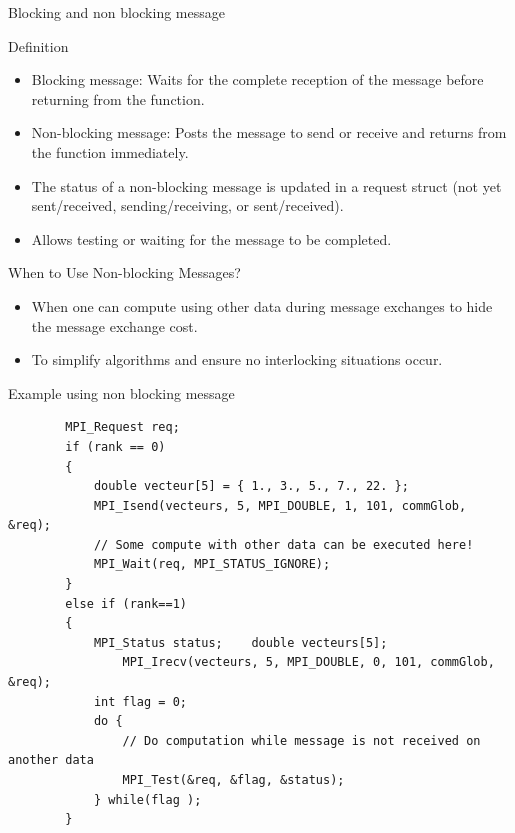 \documentclass[compress,10pt,aspectratio=169]{beamer}
\begin{document}
\begin{frame}[fragile]{Blocking and non blocking message}
    \scriptsize
    \begin{block}{Definition}
        \begin{itemize}
            \item Blocking message: Waits for the complete reception of the message before returning from the function.
            \item Non-blocking message: Posts the message to send or receive and returns from the function immediately.
            \item The status of a non-blocking message is updated in a request struct (not yet sent/received, sending/receiving, or sent/received).
            \item Allows testing or waiting for the message to be completed.
        \end{itemize}
    \end{block}
    
    \begin{exampleblock}{When to Use Non-blocking Messages?}
        \begin{itemize}
            \item When one can compute using other data during message exchanges to hide the message exchange cost.
            \item To simplify algorithms and ensure no interlocking situations occur.
        \end{itemize}
    \end{exampleblock}

\end{frame}

\begin{frame}[fragile]{Example using non blocking message}
    
    \begin{verbatim}
        MPI_Request req;
        if (rank == 0) 
        {
            double vecteur[5] = { 1., 3., 5., 7., 22. };
            MPI_Isend(vecteurs, 5, MPI_DOUBLE, 1, 101, commGlob, &req);
            // Some compute with other data can be executed here!
            MPI_Wait(req, MPI_STATUS_IGNORE);
        }
        else if (rank==1) 
        {
            MPI_Status status;    double vecteurs[5];
                MPI_Irecv(vecteurs, 5, MPI_DOUBLE, 0, 101, commGlob, &req);
            int flag = 0;
            do {
                // Do computation while message is not received on another data
                MPI_Test(&req, &flag, &status);
            } while(flag );
        }
        \end{verbatim}
\end{frame}
\end{document}
